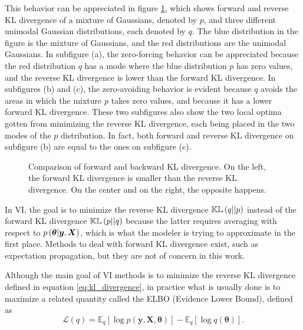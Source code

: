 This behavior can be appreciated in figure \ref{fig:KL_example}, which shows forward and reverse KL divergence of a mixture of Gaussians, denoted by $p$, and three different unimodal Gaussian distributions, each denoted by $q$. The blue distribution in the figure is the mixture of Gaussians, and the red distributions are the unimodal Gaussians.
In subfigure (a), the zero-forcing behavior can be appreciated because the red distribution $q$ has a mode where the blue distribution $p$ has zero values, and the reverse KL divergence is lower than the forward KL divergence.
In subfigures (b) and (c), the zero-avoiding behavior is evident because $q$ avoids the areas in which the mixture $p$ takes zero values, and because it has a lower forward KL divergence. These two subfigures also show the two local optima gotten from minimizing the reverse KL divergence, each being placed in the two modes of the $p$ distribution. In fact, both forward and reverse KL divergence on subfigure (b) are equal to the ones on subfigure (c).

\begin{figure}[H]
  \centering
  \hfill
  \hfill
  \caption{Comparison of forward and backward KL divergence. On the left, the forward KL divergence is smaller than the reverse KL divergence. On the center and on the right, the opposite happens.}
  \label{fig:KL_example}
\end{figure}

In VI, the goal is to minimize the reverse KL divergence $\mathbb{KL}\left( q || p \right)$ instead of the forward KL divergence $\mathbb{KL}\left( p || q \right)$ because the latter requires averaging with respect to $p\left( \boldsymbol{\theta} | \boldsymbol{y}, \boldsymbol{X} \right)$, which is what the modeler is trying to approximate in the first place. Methods to deal with forward KL divergence exist, such as expectation propagation, but they are not of concern in this work.

Although the main goal of VI methods is to minimize the reverse KL divergence defined in equation \eqref{eq:kl_divergence}, in practice what is usually done is to maximize a related quantity called the ELBO (Evidence Lower Bound), defined as
\begin{equation}
  \label{eq:elbo_def}
  \mathcal{L}(q) = \mathbb{E}_q\left[ \log p(\boldsymbol{y}, \boldsymbol{X}, \boldsymbol{\theta}) \right] - \mathbb{E}_q\left[ \log q(\boldsymbol{\theta}) \right].
\end{equation}

